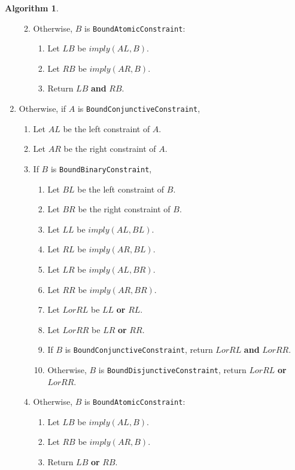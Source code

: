\documentclass[a4paper,oneside,11pt]{book}
\theoremstyle{definition}
\newtheorem{algo}{Algorithm}[section]
\begin{document}
\begin{algo}
\begin{enumerate}
\begin{enumerate}
\begin{enumerate}
\end{enumerate}
\item
Otherwise, $B$ is \verb|BoundAtomicConstraint|:
\begin{enumerate}
\item
Let $LB$ be $imply(AL, B)$.
\item
Let $RB$ be $imply(AR, B)$.
\item
Return $LB$ \textbf{and} $RB$.
\end{enumerate}
\end{enumerate}
\item
Otherwise, if $A$ is \verb|BoundConjunctiveConstraint|,
\begin{enumerate}
\item
Let $AL$ be the left constraint of $A$.
\item
Let $AR$ be the right constraint of $A$.
\item
If $B$ is \verb|BoundBinaryConstraint|,
\begin{enumerate}
\item
Let $BL$ be the left constraint of $B$.
\item
Let $BR$ be the right constraint of $B$.
\item
Let $LL$ be $imply(AL, BL)$.
\item
Let $RL$ be $imply(AR, BL)$.
\item
Let $LR$ be $imply(AL, BR)$.
\item
Let $RR$ be $imply(AR, BR)$.
\item
Let $LorRL$ be $LL$ \textbf{or} $RL$.
\item
Let $LorRR$ be $LR$ \textbf{or} $RR$.
\item
If $B$ is \verb|BoundConjunctiveConstraint|, return $LorRL$ \textbf{and} $LorRR$.
\item
Otherwise, $B$ is \verb|BoundDisjunctiveConstraint|, return $LorRL$ \textbf{or} $LorRR$.
\end{enumerate}
\item
Otherwise, $B$ is \verb|BoundAtomicConstraint|:
\begin{enumerate}
\item
Let $LB$ be $imply(AL, B)$.
\item
Let $RB$ be $imply(AR, B)$.
\item
Return $LB$ \textbf{or} $RB$.
\end{enumerate}
\end{enumerate}
\end{enumerate}
\end{algo}
\end{document}
